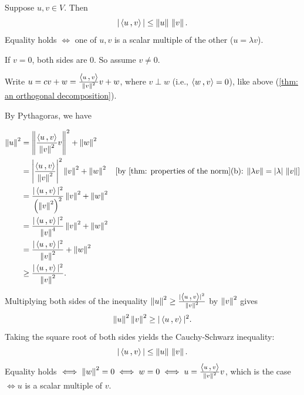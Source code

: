 \begin{thm}
  \label{thm: Cauchy-Schwarz inequality}
  Suppose $u,v \in V$. Then
  \begin{equation}
    |\ip{u}{v}| \leq \norm{u} \, \norm{v}.
  \end{equation}
  Equality holds $\iff$ one of $u,v$ is a scalar multiple of the other ($u=\lambda v$).
\end{thm}
\begin{prf}
  If $v=0$, both sides are $0$. So assume $v\neq 0$.

  Write $u = cv+w = \frac{\ip{u}{v}}{\norm{v}^2} v + w$, where $v\perp w$ (i.e., $\ip{w}{v} = 0$), like above (\ref{thm: an orthogonal decomposition}).

  By Pythagoras, we have

  \begin{minipage}{\linewidth}
  \begin{equation}
    \begin{aligned}
      \norm{u}^2
      &= \norm{ \frac{\ip{u}{v}}{\norm{v}^2} v}^2 + \norm{w}^2 \\
      &= \left| \frac{\ip{u}{v}}{\norm{v}^2} \right|^2 \norm{v}^2 + \norm{w}^2 \quad \text{[by \ref{thm: properties of the norm}(b): $\norm{\lambda v} = |\lambda|\,\norm{v}$]} \\
      &= \frac{|\ip{u}{v}|^2}{\left(\norm{v}^2\right)^2} \norm{v}^2 + \norm{w}^2 \\
      &= \frac{|\ip{u}{v}|^2}{\norm{v}^4} \norm{v}^2 + \norm{w}^2 \\
      &= \frac{|\ip{u}{v}|^2}{\norm{v}^2} + \norm{w}^2 \\
      &\geq \frac{|\ip{u}{v}|^2}{\norm{v}^2}.
    \end{aligned}
  \end{equation}
  \end{minipage}

  Multiplying both sides of the inequality $\norm{u}^2 \geq \frac{|\ip{u}{v}|^2}{\norm{v}^2}$ by $\left \lVert v \right \rVert^2$ gives
  \begin{equation}
    \norm{u}^2 \norm{v}^2 \geq |\ip{u}{v}|^2.
  \end{equation}
  Taking the square root of both sides yields the Cauchy-Schwarz inequality:
  \begin{equation}
    |\ip{u}{v}| \leq \norm{u} \, \norm{v}.
  \end{equation}
  Equality holds $\iff \norm{w}^2 = 0 \iff w = 0 \iff u = \frac{\ip{u}{v}}{\norm{v}^2} v$, which is the case $\iff u$ is a scalar multiple of $v$.
\end{prf}

